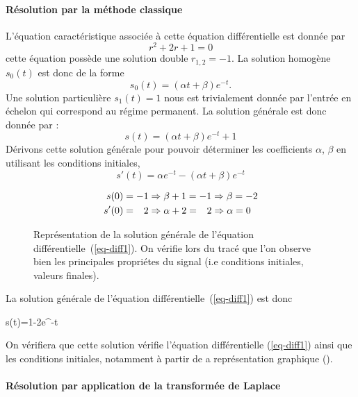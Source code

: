 \paragraph{Résolution par la méthode \og classique\fg}
L'équation caractéristique associée à cette équation différentielle est donnée par 
$$
r^2+2r+1=0
$$
cette équation possède une solution double $r_{1,2}=-1$.
La solution homogène $s_0(t)$ est donc de la forme
$$
s_0(t)=(\alpha t+\beta)e^{-t}.
$$
Une solution particulière $s_1(t)=1$ nous est trivialement donnée par l'entrée en échelon qui correspond au 
régime permanent.
La solution générale est donc donnée par :
$$
s(t)=(\alpha t+\beta)e^{-t}+1
$$
Dérivons cette solution générale pour pouvoir déterminer les coefficients $\alpha$, $\beta$ en utilisant
les conditions initiales,
$$
s'(t)=\alpha e^{-t}-(\alpha t+\beta)e^{-t}
$$

\begin{align*}
     s(0)&=-1\Rightarrow\beta+1=-1\Rightarrow\beta=-2 \\
    s'(0)&=\hphantom{-}2\Rightarrow\alpha+2=\hphantom{-}2\Rightarrow\alpha=0
\end{align*}

\begin{figure}[!t]
    \centering
{}

    \caption{Représentation de la solution générale de l'équation différentielle~(\ref{eq-diff1}). On vérifie lors 
	du tracé que l'on observe bien les principales propriétes du signal (i.e conditions initiales, valeurs finales).\label{fig-solution}}
\end{figure}

La solution générale de l'équation différentielle~(\ref{eq-diff1}) est donc 
\begin{bequation}
s(t)=1-2e^{-t}
\end{bequation}
On vérifiera que cette solution vérifie l'équation différentielle (\ref{eq-diff1}) ainsi que les conditions initiales, notamment à partir 
de a représentation graphique ().

\paragraph{Résolution par application de la transformée de Laplace}


